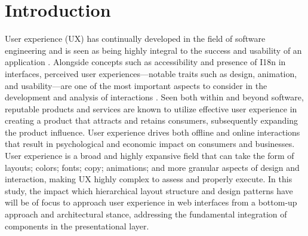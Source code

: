 \section{Introduction}
User experience (UX) has continually developed in the field of software engineering and is seen as being highly integral to the success and usability of an application \cite{10.1016/j.jvlc.2017.08.004}. Alongside concepts such as accessibility and presence of I18n in interfaces, perceived user experiences—notable traits such as design, animation, and usability—are one of the most important aspects to consider in the development and analysis of interactions \cite{benchmarking}. Seen both within and beyond software, reputable products and services are known to utilize effective user experience in creating a product that attracts and retains consumers, subsequently expanding the product influence. User experience drives both offline and online interactions that result in psychological and economic impact on consumers and businesses. User experience is a broad and highly expansive field that can take the form of layouts; colors; fonts; copy; animations; and more granular aspects of design and interaction, making UX highly complex to assess and properly execute. In this study, the impact which hierarchical layout structure and design patterns have will be of focus to approach user experience in web interfaces from a bottom-up approach and architectural stance, addressing the fundamental integration of components in the presentational layer.

